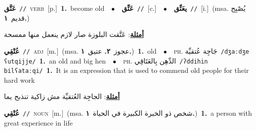 \documentclass[10pt,a4paper,twoside]{article} %
\begin{document}
\begin{multicols}{2}
{\setlength\topsep{0pt}\textbf{\foreignlanguage{arabic}{عَتَّق}}\ {\color{gray}\texttt{//}\color{black}}\ \textsc{verb}\ [p.]\ \textbf{1.}~become old\ \ $\bullet$\ \ \setlength\topsep{0pt}\textbf{\foreignlanguage{arabic}{عَتِّق}}\ {\color{gray}\texttt{//}\color{black}}\ [c.]\ \ $\bullet$\ \ \setlength\topsep{0pt}\textbf{\foreignlanguage{arabic}{يعَتِّق}}\ {\color{gray}\texttt{//}\color{black}}\ [i.]\ \color{gray}(msa. \foreignlanguage{arabic}{يُصْبِح قديم}~\foreignlanguage{arabic}{\textbf{١.}})\color{black}\  \begin{flushright}\color{gray}\foreignlanguage{arabic}{\textbf{\underline{\foreignlanguage{arabic}{أمثلة}}}: عَتَّقت البلوزة صار لازم ينعمل منها ممسحة}\end{flushright}\color{black}} \vspace{2mm}

{\setlength\topsep{0pt}\textbf{\foreignlanguage{arabic}{عُتْقِي}}\ {\color{gray}\texttt{//}\color{black}}\ \textsc{adj}\ [m.]\ \color{gray}(msa. \foreignlanguage{arabic}{عجوز}~\foreignlanguage{arabic}{\textbf{٢.}}  \foreignlanguage{arabic}{عتيق}~\foreignlanguage{arabic}{\textbf{١.}})\color{black}\ \textbf{1.}~old\ \ $\bullet$\ \ \textsc{ph.} \color{gray} \foreignlanguage{arabic}{جَاجِة عُتقيِّة}\color{black}\ {\color{gray}\texttt{/{\sffamily dʒaːdʒe ʕutqijje}/}\color{black}}\ \textbf{1.}~an old and big hen\ \ $\bullet$\ \ \textsc{ph.} \color{gray} \foreignlanguage{arabic}{الدِّهِن بِالعَتَاقِي}\color{black}\ {\color{gray}\texttt{/{\sffamily ʔddihin bilʕataːqi}/}\color{black}}\ \textbf{1.}~It is an expression that is used to commend old people for their hard work\  \begin{flushright}\color{gray}\foreignlanguage{arabic}{\textbf{\underline{\foreignlanguage{arabic}{أمثلة}}}: الجاجِة العُتقيِّة مش زاكية تنذبح يما}\end{flushright}\color{black}} \vspace{2mm}

{\setlength\topsep{0pt}\textbf{\foreignlanguage{arabic}{عُتْقِي}}\ {\color{gray}\texttt{//}\color{black}}\ \textsc{noun}\ [m.]\ \color{gray}(msa. \foreignlanguage{arabic}{شخص ذو الخبرة الكبيرة في الحياة}~\foreignlanguage{arabic}{\textbf{١.}})\color{black}\ \textbf{1.}~a person with great experience in life\ } \vspace{2mm}


\end{multicols}
\end{document}
